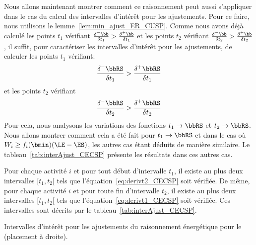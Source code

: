 Nous allons maintenant montrer comment ce raisonnement peut aussi
s'appliquer dans le cas du calcul des intervalles d'intérêt pour les
ajustements. Pour ce faire, nous utilisons le
lemme~\ref{lem:min_ajust_ER_CUSP}. Comme nous avons déjà calculé les
points $t_1$ vérifiant $\frac{\delta^{-}\bb}{\delta
t_1}>\frac{\delta^{+}\bb}{\delta t_1}$ et les points $t_2$ vérifiant
$\frac{\delta^{-}\bb}{\delta t_2} >\frac{\delta^{+}\bb}{\delta
t_2}$, il suffit, pour caractériser les intervalles d'intérêt pour les
ajustements, de calculer les points $t_1$ vérifiant:
\begin{equation}
\frac{\delta^{-}\bbRS}{\delta t_1} >\frac{\delta^{+}\bbRS}{\delta
t_1}\label{eq:derivt1_CECSP} \end{equation}
et les points $t_2$ vérifiant \begin{equation}
\frac{\delta^{-}\bbRS}{\delta t_2} > \frac{\delta^{+}\bbRS}{\delta
t_2}\label{eq:derivt2_CECSP}\end{equation}
Pour cela, nous analysons les variations des fonctions $t_1
\rightarrow \bbRS$ et $t_2 \rightarrow \bbRS$. Nous allons montrer
comment cela a été fait pour $t_1 \rightarrow \bbRS$ et dans le cas où
$W_i \ge f_i(\bmin) (\LE - \ES)$, les autres cas étant déduits de
manière similaire. Le tableau~\ref{tab:interAjust_CECSP} présente 
les résultats dans ces autres cas. 


\begin{theo}
  Pour chaque activité $i$ et pour tout début d'intervalle $t_1$, il
  existe au plus deux intervalles $[t_1,t_2[$ tels que
  l'équation~\eqref{eq:derivt2_CECSP} soit vérifiée.
  De même,  pour chaque activité $i$ et pour toute fin d'intervalle $t_2$, il
  existe au plus deux intervalles $[t_1,t_2[$ tels que
  l'équation~\eqref{eq:derivt1_CECSP} soit vérifiée. 
  Ces intervalles sont décrits
  par le tableau~\ref{tab:interAjust_CECSP}.
  \begin{table} 
  
  \caption{Intervalles d'intérêt pour les ajustements du
    raisonnement énergétique pour le \CECSP (placement à droite).}
  \label{tab:interAjust_CECSP}
\end{table}
\end{theo}

